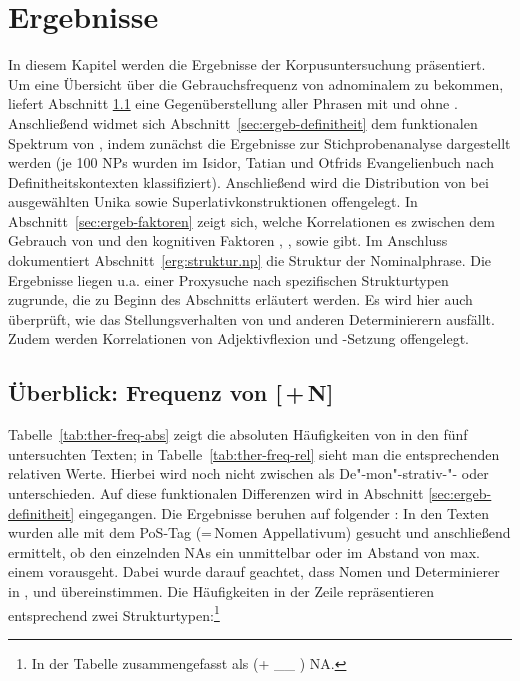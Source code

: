 \chapter{Ergebnisse}\label{ergebnisse}

In diesem Kapitel werden die Ergebnisse der Korpusuntersuchung  präsentiert. Um eine Übersicht über die Gebrauchsfrequenz von adnominalem  zu bekommen, liefert Abschnitt \ref{sec:ergeb-ther-freq} eine Gegenüberstellung aller Phrasen mit und ohne . Anschließend widmet sich Abschnitt~\ref{sec:ergeb-definitheit} dem funktionalen Spektrum von , indem zunächst die Ergebnisse zur Stichprobenanalyse dargestellt werden (je 100 NPs wurden im Isidor, Tatian und Otfrids Evangelienbuch nach Definitheitskontexten  klassifiziert). Anschließend wird die Distribution von  bei ausgewählten Unika  sowie Superlativkonstruktionen  offengelegt. In Abschnitt~\ref{sec:ergeb-faktoren} zeigt sich, welche Korrelationen es zwischen dem Gebrauch von  und den kognitiven Faktoren , ,  sowie  gibt. 
Im Anschluss dokumentiert Abschnitt~\ref{erg:struktur.np} die Struktur der  Nominalphrase. Die Ergebnisse liegen u.a. einer Proxysuche  nach spezifischen Strukturtypen zugrunde, die zu Beginn des Abschnitts erläutert werden. Es wird hier auch überprüft, wie das Stellungsverhalten  von  und anderen Determinierern  ausfällt. Zudem werden Korrelationen von Adjektivflexion und -Setzung offengelegt. 

\section{Überblick: Frequenz von [\,+\,N]}\label{sec:ergeb-ther-freq}\largerpage

Tabelle~\ref{tab:ther-freq-abs} zeigt die absoluten Häufigkeiten von  in den fünf untersuchten Texten; in Tabelle~\ref{tab:ther-freq-rel} sieht man die entsprechenden relativen Werte. Hierbei wird noch nicht zwischen  als De"-mon"-strativ-"-  oder  unterschieden. Auf diese funktionalen Differenzen wird in Abschnitt \ref{sec:ergeb-definitheit} eingegangen. Die Ergebnisse beruhen auf folgender : In den Texten wurden alle  mit dem PoS-Tag  (=\,Nomen  Appellativum) gesucht und anschließend ermittelt, ob den einzelnden NAs ein   unmittelbar oder im  Abstand von max. einem  vorausgeht. Dabei wurde darauf geachtet, dass Nomen und Determinierer  in ,  und  übereinstimmen. Die Häufigkeiten in der Zeile  repräsentieren entsprechend zwei Strukturtypen:\footnote{In der Tabelle zusammengefasst als  (+ \_\_ ) NA.}  

